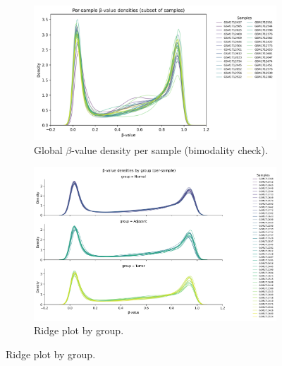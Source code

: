 \documentclass[10pt]{extarticle}
\begin{document}
\begin{figure}[H]
    \centering

    \begin{subfigure}[t]{0.48\textwidth}
        \centering
        \includegraphics[height=\panelheight, width=\linewidth, keepaspectratio]{Figures/plot_1_1_global_beta_density_per_sample.png}
        \caption{Global $\beta$-value density per sample (bimodality check).}
        \label{fig:vispanel1a}
    \end{subfigure}
    \hfill
    \begin{subfigure}[t]{0.48\textwidth}
        \centering
        \includegraphics[height=\panelheight, width=\linewidth, keepaspectratio]{Figures/plot_1_2_Ridge_plot_by_group.png}
        \caption{Ridge plot by group.}
        \label{fig:vispanel1b}
    \end{subfigure}

    \vspace{1em}


\end{figure}
\end{document}
